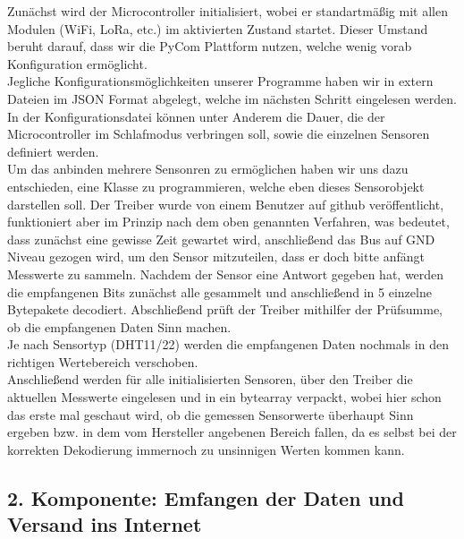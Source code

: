 Zunächst wird der Microcontroller initialisiert, wobei er standartmäßig mit allen Modulen (WiFi, LoRa, etc.) im aktivierten Zustand startet. Dieser Umstand beruht darauf, dass wir die PyCom Plattform nutzen, welche wenig vorab Konfiguration ermöglicht.\\
Jegliche Konfigurationsmöglichkeiten unserer Programme haben wir in extern Dateien im JSON Format abgelegt, welche im nächsten Schritt eingelesen werden. In der Konfigurationsdatei können unter Anderem die Dauer, die der Microcontroller im Schlafmodus verbringen soll, sowie die einzelnen Sensoren definiert werden.\\
Um das anbinden mehrere Sensonren zu ermöglichen haben wir uns dazu entschieden, eine Klasse zu programmieren, welche eben dieses Sensorobjekt darstellen soll. Der Treiber wurde von einem Benutzer auf github veröffentlicht, funktioniert aber im Prinzip nach dem oben genannten Verfahren, was bedeutet, dass zunächst eine gewisse Zeit gewartet wird, anschließend das Bus auf GND Niveau gezogen wird, um den Sensor mitzuteilen, dass er doch bitte anfängt Messwerte zu sammeln. Nachdem der Sensor eine Antwort gegeben hat, werden die empfangenen Bits zunächst alle gesammelt und anschließend in 5 einzelne Bytepakete decodiert. Abschließend prüft der Treiber mithilfer der Prüfsumme, ob die empfangenen Daten Sinn machen.\\ Je nach Sensortyp (DHT11/22) werden die empfangenen Daten nochmals in den richtigen Wertebereich \grqq verschoben\grqq.\\
Anschließend werden für alle initialisierten Sensoren, über den Treiber die aktuellen Messwerte eingelesen und in ein bytearray verpackt, wobei hier schon das erste mal geschaut wird, ob die gemessen Sensorwerte überhaupt Sinn ergeben bzw. in dem vom Hersteller angebenen Bereich fallen, da es selbst bei der korrekten Dekodierung immernoch zu unsinnigen Werten kommen kann.\\

\newpage

\subsection{2. Komponente: Emfangen der Daten und Versand ins Internet} \label{Empfänger}

